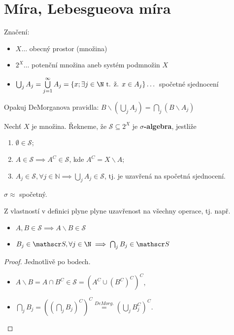 \section{Míra, Lebesgueova míra}

\begin{poznamka}
  Značení:
  \begin{itemize}
    \item $X\dots$ obecný prostor (množina)
    \item $2^X\dots$ potenční množina aneb systém podmnožin $X$
    \item $\bigcup_j A_j = \bigcup\limits_{j=1}^\infty A_j = \left\{x; \exists j \in \N \text{ t. ž. } x \in A_j\right\} \dots$ spočetné sjednocení
  \end{itemize}
\end{poznamka}

\begin{poznamka}
  Opakuj DeMorganova pravidla: $B \smallsetminus \left(\bigcup_j A_j\right) = \bigcap_j(B \smallsetminus A_j)$
\end{poznamka}

\begin{definice}
  Nechť $X$ je množina. Řekneme, že $\mathscr S \subseteq 2^X$ je \textbf{$\sigma$-algebra}, jestliže
  \begin{enumerate}[1.]
    \item $\emptyset \in \mathscr S$;
    \item $A \in \mathscr S \implies A^C \in \mathscr S$, kde $A^C = X \smallsetminus A$;
    \item $A_j \in \mathscr S, \forall j \in \mathbb N \implies\bigcup_j A_j \in \mathscr S$, tj. je uzavřená na spočetná sjednocení.
  \end{enumerate}
\end{definice}

\begin{poznamka}
  $\sigma \approx$ spočetný.

  Z vlastností v definici plyne plyne uzavřenost na všechny  operace, tj. např.
  \begin{itemize}
    \item $A, B \in \mathscr S \implies A \smallsetminus B \in \mathscr S$
    \item $B_j \in \mathscr S, \forall j \in \N\implies \bigcap_j B_j \in \mathscr S$
  \end{itemize}
\end{poznamka}

\begin{proof}
  Jednotlivě po bodech.
  \begin{itemize}
    \item $A\smallsetminus B = A \cap B^C \in \mathscr S = \left(A^C \cup \left(B^C\right)^C\right)^C$,
    \item $\bigcap_j B_j = \left(\left(\bigcap_j B_j\right)^C\right)^C\stackrel{DeMorg.}{=}\left(\bigcup_j B_j^C\right)^C$.
  \end{itemize}
\end{proof}

